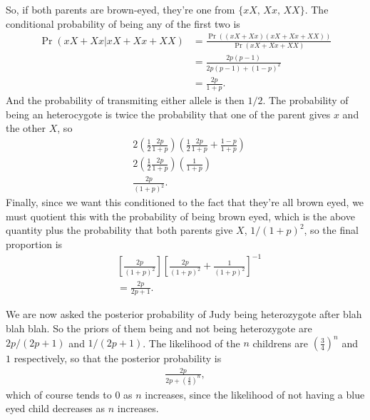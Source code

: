 \documentclass{article}
\newcommand\oname\operatorname
\begin{document}
So, if both parents are brown-eyed, they're one from $\{xX,\,Xx,\,XX\}$. The conditional probability of being any of the first two is
\begin{align*}
	\oname{Pr}(xX+Xx|xX+Xx+XX)&=\frac{\oname{Pr}((xX+Xx)(xX+Xx+XX))}{\oname{Pr}(xX+Xx+XX)}\\
	&=\frac{2p(p-1)}{2p(p-1)+(1-p)^2}\\
	&=\frac{2p}{1+p}.
\end{align*}
And the probability of transmiting either allele is then $1/2$. The probability of being an heterocygote is twice the probability that one of the parent gives $x$ and the other $X$, so
\begin{align*}
	&2\left(\frac12\frac{2p}{1+p}\right)\left(\frac12\frac{2p}{1+p}+\frac{1-p}{1+p}\right)\\
	&2\left(\frac12\frac{2p}{1+p}\right)\left(\frac1{1+p}\right)\\
	&\frac{2p}{(1+p)^2}.
\end{align*}
Finally, since we want this conditioned to the fact that they're all brown eyed, we must quotient this with the probability of being brown eyed, which is the above quantity plus the probability that both parents give $X$, $1/(1+p)^2$, so the final proportion is
\begin{align*}
	&\left[\frac{2p}{(1+p)^2}\right]\left[\frac{2p}{(1+p)^2}+\frac1{(1+p)^2}\right]^{-1}\\
	&=\frac{2p}{2p+1}.
\end{align*}

We are now asked the posterior probability of Judy being heterozygote after blah blah blah. So the priors of them being and not being heterozygote are $2p/(2p+1)$ and $1/(2p+1)$. The likelihood of the $n$ childrens are $\left(\frac34\right)^n$ and $1$ respectively, so that the posterior probability is
\begin{align*}
	\frac{2p}{2p+\left(\frac43\right)^n},
\end{align*}
which of course tends to $0$ as $n$ increases, since the likelihood of not having a blue eyed child decreases as $n$ increases.
\end{document}
